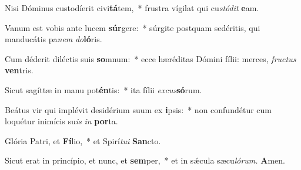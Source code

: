 \item Nisi Dóminus custodíerit civi\textbf{tá}tem,~* frustra vígilat qui cu\spurhspace\textit{stódit} \textbf{e}am.
\item Vanum est vobis ante lucem \textbf{súr}gere:~* súrgite postquam sedéritis, qui manducátis pa\textit{nem} \textit{do}\textbf{ló}ris.
\item Cum déderit diléctis suis \textbf{so}mnum:~* ecce hæréditas Dómini fílii: merces, \textit{fructus} \textbf{ven}tris.
\item Sicut sagíttæ in manu pot\textbf{én}tis:~* ita fílii \textit{excus}\textbf{só}rum.
\item Beátus vir qui implévit desidérium suum ex \textbf{i}psis:~* non confundétur cum loquétur inimícis su\tinyhspace\textit{is} \textit{in} \textbf{por}ta.
\item Glória Patri, et \textbf{Fí}lio,~* et Spirí\tinyhspace\textit{tui} \textbf{San}cto.
\item Sicut erat in princípio, et nunc, et \textbf{sem}per,~* et in sǽcula sæcu\tinyhspace\textit{lórum.} \textbf{A}men.

